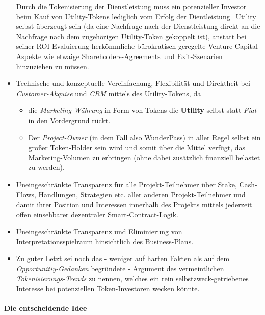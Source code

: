 \begin{Praemisse}
\begin{itemize}
	Durch die Tokenisierung der Dienstleistung muss ein potenzieller Investor beim Kauf von Utility-Tokens lediglich vom Erfolg der Dientleistung=Utility selbst überzeugt sein (da eine Nachfrage nach der Dienstleistung direkt an die Nachfrage nach dem zugehörigen Utility-Token gekoppelt ist), anstatt bei seiner ROI-Evaluierung herkömmliche bürokratisch geregelte Venture-Capital-Aspekte wie etwaige Shareholders-Agreements und Exit-Szenarien hinzuziehen zu müssen.
	\item Technische und konzeptuelle Vereinfachung, Flexibilität und Direktheit bei \textit{Customer-Akquise} und \textit{CRM} mittels des Utility-Tokens, da
	\begin{itemize}
		\item die \textit{Marketing-Währung} in Form von Tokens die \textbf{Utility} selbst statt \textit{Fiat} in den Vordergrund rückt.
		\item Der \textit{Project-Owner} (in dem Fall also WunderPass) in aller Regel selbst ein großer Token-Holder sein wird und somit über die Mittel verfügt, das Marketing-Volumen zu erbringen (ohne dabei zusätzlich finanziell belastet zu werden).
	\end{itemize}
	\item Uneingeschränkte Transparenz für alle Projekt-Teilnehmer über Stake, Cash-Flows, Handlungen, Strategien etc. aller anderen Projekt-Teilnehmer und damit ihrer Position und Interessen innerhalb des Projekts mittels jederzeit offen einsehbarer dezentraler Smart-Contract-Logik.
	\item Uneingeschränkte Transparenz und Eliminierung von Interpretationsspielraum hinsichtlich des Business-Plans.
	\item Zu guter Letzt sei noch das - weniger auf harten Fakten als auf dem \textit{Opportunitiy-Gedanken} begründete - Argument des vermeintlichen \textit{Tokenisierungs-Trends} zu nennen, welches ein rein selbstzweck-getriebenes Interesse bei potenziellen Token-Investoren wecken könnte.
\end{itemize}

\end{Praemisse}

\vspace{0.5cm}

\paragraph{Die entscheidende Idee}
\textbf{ }
\vspace{0.3cm}

